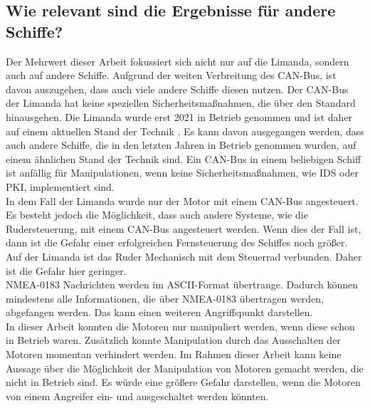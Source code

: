 \subsection{Wie relevant sind die Ergebnisse für andere Schiffe?}
Der Mehrwert dieser Arbeit fokussiert sich nicht nur auf die Limanda, sondern auch auf andere Schiffe.
Aufgrund der weiten Verbreitung des CAN-Bus, ist davon auszugehen, dass auch viele andere Schiffe diesen nutzen.
Der CAN-Bus der Limanda hat keine speziellen Sicherheitsmaßnahmen, die über den Standard hinausgehen. 
Die Limanda wurde erst 2021 in Betrieb genommen und ist daher auf einem aktuellen Stand der Technik \cite{limanda}.
Es kann davon ausgegangen werden, dass auch andere Schiffe, die in den letzten Jahren in Betrieb genommen wurden, auf einem
ähnlichen Stand der Technik sind. Ein CAN-Bus in einem beliebigen Schiff ist anfällig für Manipulationen, wenn keine
Sicherheitsmaßnahmen, wie IDS oder PKI, implementiert sind. \\
In dem Fall der Limanda wurde nur der Motor mit einem CAN-Bus angesteuert. Es besteht jedoch die Möglichkeit, dass auch 
andere Systeme, wie die Rudersteuerung, mit einem CAN-Bus angesteuert werden. Wenn dies der Fall ist, dann 
ist die Gefahr einer erfolgreichen Fernsteuerung des Schiffes noch größer. Auf der Limanda ist das Ruder Mechanisch
mit dem Steuerrad verbunden. Daher ist die Gefahr hier geringer.
\\
NMEA-0183 Nachrichten werden im ASCII-Format übertrange. Dadurch können mindestens 
alle Informationen, die über NMEA-0183 übertragen werden, abgefangen werden. Das kann einen weiteren Angriffspunkt darstellen. \\
In dieser Arbeit konnten die Motoren nur manipuliert werden, wenn diese schon in Betrieb waren. Zusätzlich konnte
Manipulation durch das Ausschalten der Motoren momentan verhindert werden. Im Rahmen dieser Arbeit kann keine Aussage über 
die Möglichkeit der Manipulation von Motoren gemacht werden, die nicht in Betrieb sind. Es würde eine größere Gefahr
darstellen, wenn die Motoren von einem Angreifer ein- und ausgeschaltet werden könnten. \\

